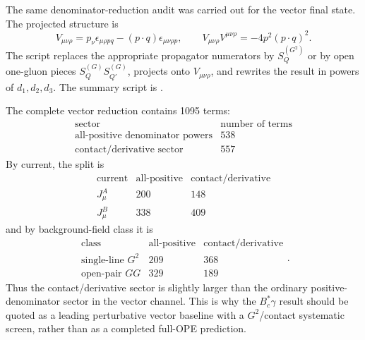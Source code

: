 \documentclass[11pt]{article}
\newcommand{\Bcst}{B_c^\ast}
\begin{document}
The same denominator-reduction audit was carried out for the vector final
state.  The projected structure is
\[
  V_{\mu\nu\rho}
  =
  p_\nu\epsilon_{\mu\rho pq}
  -
  (p\cdot q)\epsilon_{\mu\nu\rho p},
  \qquad
  V_{\mu\nu\rho}V^{\mu\nu\rho}=-4p^2(p\cdot q)^2 .
\]
The script  replaces the
appropriate propagator numerators by \(S_Q^{(G^2)}\) or by open one-gluon
pieces \(S_Q^{(G)}S_{Q'}^{(G)}\), projects onto \(V_{\mu\nu\rho}\), and rewrites
the result in powers of \(d_1,d_2,d_3\).  The summary script is
.

The complete vector reduction contains 1095 terms:
\[
\begin{array}{c|c}
\text{sector} & \text{number of terms}\\
\hline
\text{all-positive denominator powers} & 538\\
\text{contact/derivative sector} & 557
\end{array}
\]
By current, the split is
\[
\begin{array}{c|cc}
\text{current} & \text{all-positive} & \text{contact/derivative}\\
\hline
J^A_\mu & 200 & 148\\
J^B_\mu & 338 & 409
\end{array}
\]
and by background-field class it is
\[
\begin{array}{c|cc}
\text{class} & \text{all-positive} & \text{contact/derivative}\\
\hline
\text{single-line }G^2 & 209 & 368\\
\text{open-pair }GG & 329 & 189
\end{array}.
\]
Thus the contact/derivative sector is slightly larger than the ordinary
positive-denominator sector in the vector channel.  This is why the
\(\Bcst\gamma\) result should be quoted as a leading perturbative vector
baseline with a \(G^2\)/contact systematic screen, rather than as a completed
full-OPE prediction.
\end{document}
